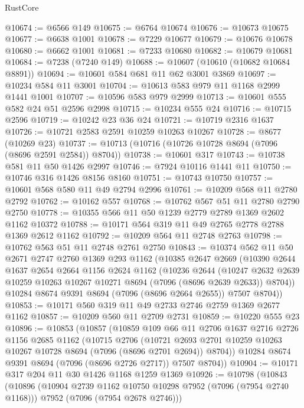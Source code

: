 \begin{lexlean}{RustCore}
\begin{coremodule}
@10674 := @6566 @149
@10675 := @6764 @10674
@10676 := @10673 @10675
@10677 := @6638 @1001
@10678 := @7229 @10677
@10679 := @10676 @10678
@10680 := @6662 @1001
@10681 := @7233 @10680
@10682 := @10679 @10681
@10684 := @7238 (@7240 @149)
@10688 := @10607 (@10610 (@10682 @10684 @8891))
@10694 := @10601 @584 @681 @11 @62 @3001 @3869
@10697 := @10234 @584 @11 @3001
@10704 := @10613 @583 @979 @11 @1168 @2999 @1441 @1001
@10707 := @10596 @583 @979 @2999
@10713 := @10601 @555 @582 @24 @51 @2596 @2998
@10715 := @10234 @555 @24
@10716 := @10715 @2596
@10719 := @10242 @23 @36 @24
@10721 := @10719 @2316 @1637
@10726 := @10721 @2583 @2591 @10259 @10263 @10267
@10728 := @8677 (@10269 @23)
@10737 := @10713 (@10716 (@10726 @10728 @8694 (@7096 (@8696 @2591 @2584)) @8704))
@10738 := @10601 @317
@10743 := @10738 @581 @11 @50 @1426 @2997
@10746 := @7924 @10116 @1441 @11
@10750 := @10746 @316 @1426 @8156 @8160
@10751 := @10743 @10750
@10757 := @10601 @568 @580 @11 @49 @2794 @2996
@10761 := @10209 @568 @11 @2780 @2792
@10762 := @10162 @557
@10768 := @10762 @567 @51 @11 @2780 @2790 @2750
@10778 := @10355 @566 @11 @50 @1239 @2779 @2789 @1369 @2602 @1162 @10372
@10788 := @10171 @564 @319 @11 @49 @2765 @2778 @2788 @1369 @2612 @1162
@10792 := @10209 @564 @11 @2748 @2763
@10798 := @10762 @563 @51 @11 @2748 @2761 @2750
@10843 := @10374
    @562
    @11
    @50
    @2671
    @2747
    @2760
    @1369
    @293
    @1162
    (@10385
      @2647
      @2669
      (@10390
        @2644
        @1637
        @2654
        @2664
        @1156
        @2624
        @1162
        (@10236
          @2644
          (@10247 @2632 @2639 @10259 @10263 @10267 @10271 @8694 (@7096 (@8696 @2639 @2633)) @8704))
        @10284
        @8674
        @9391
        @8694
        (@7096 (@8696 @2664 @2655))
        @7507
        @8704))
@10853 := @10171 @560 @319 @11 @49 @2733 @2746 @2759 @1369 @2677 @1162
@10857 := @10209 @560 @11 @2709 @2731
@10859 := @10220 @555 @23
@10896 := @10853
    (@10857
      (@10859
        @109
        @66
        @11
        @2706
        @1637
        @2716
        @2726
        @1156
        @2685
        @1162
        (@10715
          @2706
          (@10721 @2693 @2701 @10259 @10263 @10267 @10728 @8694 (@7096 (@8696 @2701 @2694)) @8704))
        @10284
        @8674
        @9391
        @8694
        (@7096 (@8696 @2726 @2717))
        @7507
        @8704))
@10904 := @10171 @317 @204 @11 @30 @1426 @1168 @1259 @1369
@10926 := @10798
    (@10843
      (@10896
        (@10904 @2739 @1162 @10750 @10298 @7952 (@7096 (@7954 @2740 @1168)))
        @7952
        (@7096 (@7954 @2678 @2746)))

\end{coremodule}
\end{lexlean}
